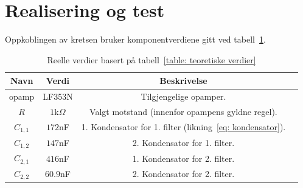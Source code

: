 \documentclass[a4paper,11pt,norsk]{article}
\begin{document}
\section{Realisering og test}
\label{sec:realisering}
Oppkoblingen av kretsen bruker komponentverdiene gitt ved tabell~\ref{table: reelle verdier}.
\begin{table}[htbp]
\centering
\begin{tabular}{ |c|c|c|c| } 
\hline
\textbf{Navn} & \textbf{Verdi} & \textbf{Beskrivelse}\\
\hline
opamp & LF353N & Tilgjengelige opamper.
\\
\hline
$R$ & $1$k$\Omega$ & Valgt motstand (innenfor opampens gyldne regel).
\\
\hline
$C_{1, 1}$ & $172$nF & 1. Kondensator for 1. filter (likning~\ref{eq: kondensator}). 
\\
\hline
$C_{1, 2}$ & $147$nF & 2. Kondensator for 1. filter.
\\
\hline
$C_{2, 1}$ & $416$nF & 1. Kondensator for 2. filter.
\\
\hline
$C_{2, 2}$ & $60.9$nF & 2. Kondensator for 2. filter.
\\
\hline
\end{tabular}
\caption{Reelle verdier basert på tabell~\ref{table: teoretiske verdier}}
\label{table: reelle verdier}
\end{table}
\\
\end{document}
